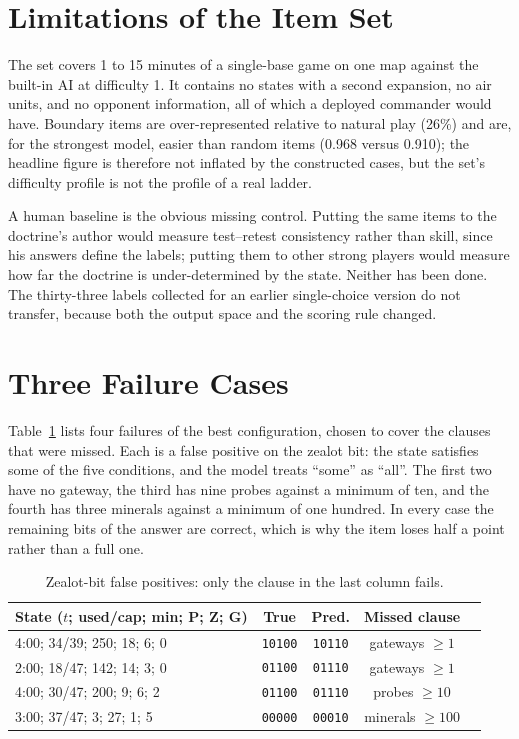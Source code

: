 \documentclass[journal]{IEEEtran}
\begin{document}
\section{Limitations of the Item Set}

The set covers 1 to 15 minutes of a single-base game on one map against the built-in AI at
difficulty 1. It contains no states with a second expansion, no air units, and no opponent
information, all of which a deployed commander would have. Boundary items are over-represented
relative to natural play (26\%) and are, for the strongest model, easier than random items
(0.968 versus 0.910); the headline figure is therefore not inflated by the constructed cases,
but the set's difficulty profile is not the profile of a real ladder.

A human baseline is the obvious missing control. Putting the same items to the doctrine's author
would measure test--retest consistency rather than skill, since his answers define the labels;
putting them to other strong players would measure how far the doctrine is under-determined by
the state. Neither has been done. The thirty-three labels collected for an earlier single-choice
version do not transfer, because both the output space and the scoring rule changed.

\section{Three Failure Cases}

Table~\ref{tab:cases} lists four failures of the best configuration, chosen to cover the clauses
that were missed. Each is a false positive on the zealot bit: the state satisfies some of the
five conditions, and the model treats ``some'' as ``all''. The first two have no gateway, the
third has nine probes against a minimum of ten, and the fourth has three minerals against a
minimum of one hundred. In every case the remaining bits of the answer are correct, which is why
the item loses half a point rather than a full one.

\begin{table}[H]
\centering
\caption{Zealot-bit false positives: only the clause in the last column fails.}
\label{tab:cases}
\footnotesize
\begin{tabular}{@{}lcccc@{}}
\toprule
State ($t$; used/cap; min; P; Z; G) & True & Pred. & Missed clause \\
\midrule
4:00; 34/39; 250; 18; 6; 0  & \texttt{10100} & \texttt{10110} & gateways $\ge 1$ \\
2:00; 18/47; 142; 14; 3; 0  & \texttt{01100} & \texttt{01110} & gateways $\ge 1$ \\
4:00; 30/47; 200; 9; 6; 2   & \texttt{01100} & \texttt{01110} & probes $\ge 10$ \\
3:00; 37/47; 3; 27; 1; 5    & \texttt{00000} & \texttt{00010} & minerals $\ge 100$ \\
\bottomrule
\end{tabular}
\end{table}
\end{document}
